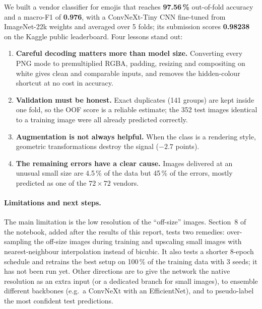 \documentclass[11pt,a4paper]{article}
\newcommand{\kagglepublic}{0.98238}
\begin{document}
We built a vendor classifier for emojis that reaches \textbf{97.56\,\%} out-of-fold accuracy and a
macro-F1 of \textbf{0.976}, with a ConvNeXt-Tiny CNN fine-tuned from ImageNet-22k weights and averaged
over 5 folds; its submission scores \textbf{\kagglepublic} on the Kaggle public leaderboard. Four
lessons stand out:
\begin{enumerate}
  \item \textbf{Careful decoding matters more than model size.} Converting every PNG mode to premultiplied
  RGBA, padding, resizing and compositing on white gives clean and comparable inputs, and removes the
  hidden-colour shortcut at no cost in accuracy.
  \item \textbf{Validation must be honest.} Exact duplicates (141 groups) are kept inside one fold, so the
  OOF score is a reliable estimate; the 352 test images identical to a training image were all already
  predicted correctly.
  \item \textbf{Augmentation is not always helpful.} When the class is a rendering style, geometric
  transformations destroy the signal ($-2.7$ points).
  \item \textbf{The remaining errors have a clear cause.} Images delivered at an unusual small size are
  4.5\,\% of the data but 45\,\% of the errors, mostly predicted as one of the $72\times72$ vendors.
\end{enumerate}

\paragraph{Limitations and next steps.} The main limitation is the low resolution of the ``off-size''
images. Section~8 of the notebook, added after the results of this report, tests two remedies:
over-sampling the off-size images during training and upscaling small images with nearest-neighbour
interpolation instead of bicubic. It also tests a shorter 8-epoch schedule and retrains the best setup
on 100\,\% of the training data with 3 seeds; it has not been run yet. Other directions are to give the
network the native resolution as an extra input (or a dedicated branch for small images), to ensemble
different backbones (e.g.\ a ConvNeXt with an EfficientNet), and to pseudo-label the most confident test
predictions.
\end{document}
